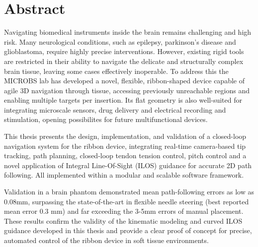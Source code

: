 


\section*{Abstract}
Navigating biomedical instruments inside the brain remains challenging and high risk. Many neurological conditions, such as epilepsy, parkinson's disease and glioblastoma, require highly precise interventions. However, existing rigid tools are restricted in their ability to navigate the delicate and structurally complex brain tissue, leaving some cases effectively inoperable. To address this the MICROBS lab has developed a novel, flexible, ribbon-shaped device capable of agile 3D navigation through tissue, accessing previously unreachable regions and enabling multiple targets per insertion. Its flat geometry is also well-suited for integrating microscale sensors, drug delivery and electrical recording and stimulation, opening possibilites for future multifunctional devices. 

This thesis presents the design, implementation, and validation of a closed-loop navigation system for the ribbon device, integrating real-time camera-based tip tracking, path planning, closed-loop tendon tension control, pitch control and a novel application of Integral Line-Of-Sight (ILOS) guidance for accurate 2D path following. All implemented within a modular and scalable software framework.

Validation in a brain phantom demonstrated mean path-following errors as low as 0.08mm, surpassing the state-of-the-art in flexible needle steering (best reported mean error 0.3 mm) and far exceeding the 3-5mm errors of manual placement. These results confirm the validity of the kinematic modeling and curved ILOS guidance developed in this thesis and provide a clear proof of concept for precise, automated control of the ribbon device in soft tissue environments. 

